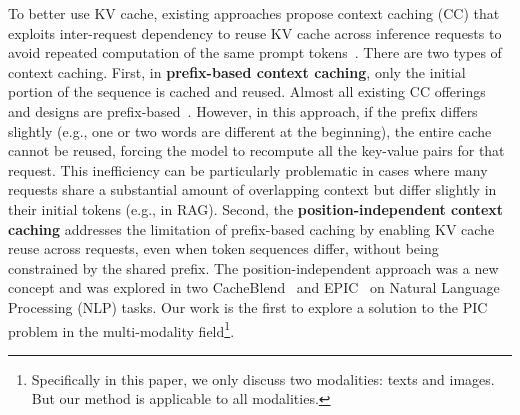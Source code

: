 To better use KV cache, existing approaches propose context caching (CC) that exploits inter-request dependency to reuse KV cache across inference requests to avoid repeated computation of the same prompt tokens~\cite{kwon2023efficient, zheng2024sglang, yao2024cacheblend, hu2024epic}. There are two types of context caching. First, in \textbf{prefix-based context caching}, only the initial portion of the sequence is cached and reused. Almost all existing CC offerings and designs are prefix-based~\cite{kwon2023efficient, zheng2024sglang, hu2024memserve, zhong2024}. However, in this approach, if the prefix differs slightly (e.g., one or two words are different at the beginning), the entire cache cannot be reused, forcing the model to recompute all the key-value pairs for that request. This inefficiency can be particularly problematic in cases where many requests share a substantial amount of overlapping context but differ slightly in their initial tokens (e.g., in RAG).
%
Second, the \textbf{position-independent context caching }addresses the limitation of prefix-based caching by enabling KV cache reuse across requests, even when token sequences differ, without being constrained by the shared prefix. The position-independent approach was a new concept and was explored in two CacheBlend~\cite{yao2024cacheblend} and EPIC~\cite{hu2024epic} on Natural Language Processing (NLP) tasks. Our work is the first to explore a solution to the PIC problem in the multi-modality field\footnote{Specifically in this paper, we only discuss two modalities: texts and images. But our method is applicable to all modalities.}.